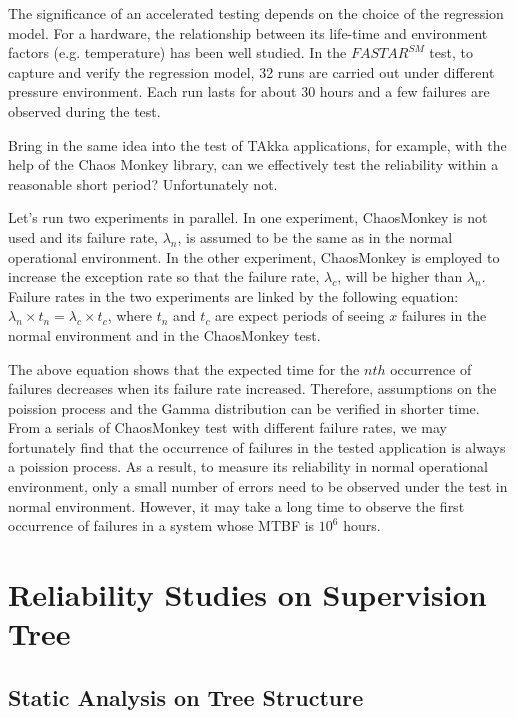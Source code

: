 \documentclass[12pt, authoryear]{article}
\begin{document}
The significance of an accelerated testing depends on the choice of the 
regression model.  For a hardware, the relationship between its life-time 
and environment factors (e.g. temperature) has been well studied.  In the 
$FASTAR^{SM}$ test, to capture and verify the regression model, 32 runs are 
carried out under different pressure environment.  Each run lasts for about 30 
hours and a few failures are observed during the test.  

Bring in the same idea into the test of TAkka applications, for example, with 
the help of the Chaos Monkey library, can we effectively test the reliability 
within a reasonable short period?  Unfortunately not.  

Let's run two experiments in parallel.  In one experiment, ChaosMonkey is not 
used and its failure rate, $\lambda_n$, is assumed to be the same as in the 
normal operational environment. In the other experiment, ChaosMonkey is 
employed to increase the exception rate so that the failure rate, $\lambda_c$, 
will be higher than $\lambda_n$.  Failure rates in the two experiments are 
linked by the following equation:
$\lambda_n \times t_n = \lambda_c \times t_c$, where $t_n$ and $t_c$ are expect 
periods of seeing $x$ failures in the normal environment and in the ChaosMonkey 
test.

The above equation shows that the expected time for the $nth$ occurrence of 
failures decreases when its failure rate increased.  Therefore, assumptions 
on the poission process and the Gamma distribution can be verified in shorter 
time.  From a serials of ChaosMonkey test with different failure rates, we may 
fortunately find that the occurrence of failures in the tested application is 
always a poission process.  As a result, to measure its reliability in normal 
operational environment, only a small number of errors need to be observed 
under the test in normal environment.  However, it may take a long time to 
observe the first occurrence of failures in a system whose MTBF is $10^6$ 
hours.




\section{Reliability Studies on Supervision Tree}\label{supervision}

\subsection{Static Analysis on Tree Structure}\label{Static}
\end{document}
